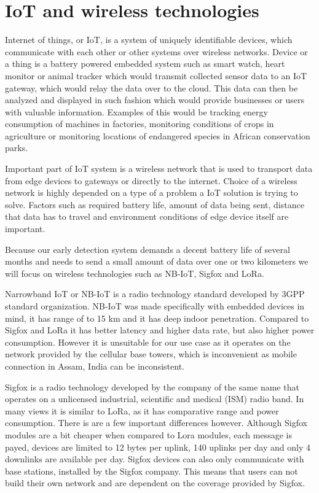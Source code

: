 \section{ IoT and wireless technologies}

Internet of things, or IoT, is a system of uniquely identifiable devices, which communicate with each other or other systems over wireless networks\cite{IoT}.
Device or a thing is a battery powered embedded system such as smart watch, heart monitor or animal tracker which would transmit collected sensor data to an IoT gateway, which would relay the data over to the cloud.
This data can then be analyzed and displayed in such fashion which would provide businesses or users with valuable information.
Examples of this would be tracking energy consumption of machines in factories, monitoring conditions of crops in agriculture or monitoring locations of endangered species in African conservation parks.

Important part of IoT system is a wireless network that is used to transport data from edge devices to gateways or directly to the internet.
Choice of a wireless network is highly depended on a type of a problem a IoT solution is trying to solve.
Factors such as required battery life, amount of data being sent, distance that data has to travel and environment conditions of edge device itself are important.

Because our early detection system demands a decent battery life of several months and needs to send a small amount of data over one or two kilometers we will focus on wireless technologies such as NB-IoT, Sigfox and LoRa.

Narrowband IoT or NB-IoT is a radio technology standard developed by 3GPP standard organization\cite{lora_nbiot}.
NB-IoT was made specifically with embedded devices in mind, it has range of to 15 \si{\kilo\meter} and it has deep indoor penetration\cite{lora_nbiot}.
Compared to Sigfox and LoRa it has better latency and higher data rate, but also higher power consumption\cite{lora_nbiot_sigfox}.
However it is unsuitable for our use case as it operates on the network provided by the cellular base towers, which is inconvenient as mobile connection in Assam, India can be inconsistent\cite{wildlabs-elephants}.

Sigfox is a radio technology developed by the company of the same name that operates on a unlicensed industrial, scientific and medical (ISM) radio band.
In many views it is similar to LoRa, as it has comparative range and power consumption\cite{lora_nbiot_sigfox}.
There is are a few important differences however.
Although Sigfox modules are a bit cheaper when compared to Lora modules, each message is payed, devices are limited to 12 bytes per uplink, 140 uplinks per day and only 4 downlinks are available per day.
Sigfox devices can also only communicate with base stations, installed by the Sigfox company\cite{lora_nbiot_sigfox}.
This means that users can not build their own network and are dependent on the coverage provided by Sigfox.

